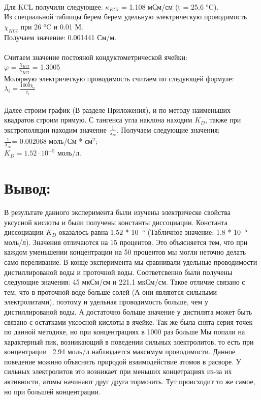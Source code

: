 \documentclass[a4paper,12pt]{article} %
\begin{document}
\paragraph{}
Для KCL получили следующее: $\kappa_{KCl} $ = 1.108 мСм/см (t = 25.6 °C).
\\Из специальной таблицы берем берем удельную электрическую проводимость $\chi_{KCl}$ при 26 °C и 0.01 М. 
\\ Получаем значение: 0.001441 См/м.

\paragraph{}
Считаем значение постояной кондуктометрической ячейки: 
\\$\varphi$ = $\frac{\chi_{KCl}}{\kappa_{KCl}}$ = 1.3005
\\Молярную электрическую проводимость считаем по следующей формуле: $\lambda_{i} = \frac{1000 \chi_{i}}{ c_i}$

\paragraph{}
Далее строим график (В разделе Приложения), и по методу наименьших квадратов строим прямую. С тангенса угла наклона находим $K_D$, также при экстрополяции находим значение $\frac{1}{\lambda_{\infty}}$. Получаем следующие значения:
\\ $\frac{1}{\lambda_{\infty}}$= 0.002068 моль/См * см$^2$;
\\ $K_D = 1.52 \cdot 10^{-5} $ моль/л. 
\section{Вывод:}
В результате данного эксперимента были изучены электрическе свойства уксусной кислоты и были получены константы диссоциации. 
Константа диссоциации $K_D$ оказалось равна 1.52 * 10$^{-5}$ (Табличное значение: 1.8 * 10$^{-5}$ моль/л). 
Значения отличаются на 15 процентов. 
Это объясняется тем, что при каждом уменьшении концентрации на 50 процентов мы могли неточно делать само переливание. 
В конце эксперимента мы сравнивали удельные проводимости дистиллированой воды и проточной воды. 
Соответсвенно были получены следующие значения: 45 мкСм/см и 221.1 мкСм/см. 
Такое отличие связано с тем, что в проточной воде больше солей (А они являются сильными электролитами), поэтому и удельная проводимость больше, чем у дистиллированой воды. 
А достаточно больше значение у дистилята может быть связано с остатками уксосной кислоты в ячейке.
Так же была снята серия точек по данной методике, но при концентрациях в 1000 раз больше
Мы попали на характерный пик, возникающий в поведении сильных электролитов, то есть при концентрации ~2.94 моль/л наблюдается максимум проводимости. 
Данное поведение можнно объяснить природой взаимодействие атомов в расворе. У сильных электролитов это возникает при меньших концетрациях из-за их активности, атомы начинают друг друга тормозить.
Тут происходит то же самое, но при большей концентрации.
\end{document}
